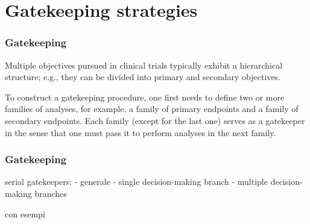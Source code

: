\documentclass[xcolor={pdftex,dvipsnames,table}]{beamer}
\begin{document}
\begin{frame}
\begin{center}
\end{center}
\end{frame}

\section{Gatekeeping strategies}

\begin{frame}
\frametitle{Gatekeeping}
Multiple objectives pursued in clinical trials typically exhibit a hierarchical structure; e.g., they can be divided into primary and secondary objectives.

\bigskip

To construct a gatekeeping procedure, one first needs to define two or
more families of analyses, for example, a family of primary endpoints and a
family of secondary endpoints. Each family (except for the last one) serves
as a gatekeeper in the sense that one must pass it to perform analyses in the
next family.

\end{frame}

\begin{frame}
\frametitle{Gatekeeping}
serial gatekeepers:
- generale
- single decision-making branch
- multiple decision-making branches

con esempi
\end{frame}
\end{document}
